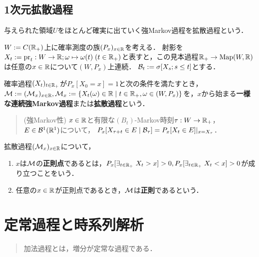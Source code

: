 \documentclass[uplatex,dvipdfmx]{jsreport}
\begin{document}
\section{1次元拡散過程}

\begin{tcolorbox}[colframe=ForestGreen, colback=ForestGreen!10!white,breakable,colbacktitle=ForestGreen!40!white,coltitle=black,fonttitle=\bfseries\sffamily,
title=]
    与えられた領域$U$をほとんど確実に出ていく強Markov過程を拡散過程という．
\end{tcolorbox}

\begin{notation}
    $W:=C(\mathbb{R}_+)$上に確率測度の族$(P_x)_{x\in\mathbb{R}}$を考える．
    射影を$X_t:=\mathrm{pr}_t:W\to\mathbb{R};\omega\mapsto\omega(t)\;(t\in\mathbb{R}_+)$と表すと，この見本過程$\mathbb{R}_+\to\mathrm{Map}(W,\mathbb{R})$は任意の$x\in\mathbb{R}$について$(W,P_x)$上連続．
    $\mathcal{B}_t:=\sigma[X_s;s\le t]$とする．
\end{notation}

\begin{definition}
    確率過程$(X_t)_{t\in\mathbb{R}_+}$が$P_x[X_0=x]=1$と次の条件を満たすとき，$\mathcal{M}:=(\mathcal{M}_x)_{x\in\mathbb{R}},\mathcal{M}_x:=\left\{X_t(\omega)\in\mathbb{R}\mid t\in\mathbb{R}_+,\omega\in(W,P_x)\right\}$を，$x$から始まる\textbf{一様な連続強Markov過程}または\textbf{拡散過程}という．
    \begin{quote}
        (強Markov性) $x\in\mathbb{R}$と有限な$(B_t)$-Markov時刻$\tau:W\to\mathbb{R}_+$，$E\in\mathcal{B}^1(\mathbb{R}^1)$について，
        $P_x[X_{\tau+t}\in E\mid\mathcal{B}_\tau]=P_x[X_t\in E]|_{x=X_\tau}$．
    \end{quote}
\end{definition}

\begin{definition}
    拡散過程$(\mathcal{M}_x)_{x\in\mathbb{R}}$について，
    \begin{enumerate}
        \item $x$は$\mathcal{M}$の\textbf{正則点}であるとは，$P_x[\exists_{t\in\mathbb{R}_+}\;X_t>x]>0,P_x[\exists_{t\in\mathbb{R}_+}\;X_t<x]>0$が成り立つことをいう．
        \item 任意の$x\in\mathbb{R}$が正則点であるとき，$\mathcal{M}$は\textbf{正則}であるという．
    \end{enumerate}
\end{definition}

\chapter{定常過程と時系列解析}

\begin{quotation}
    加法過程とは，増分が定常な過程である．
\end{quotation}
\end{document}
